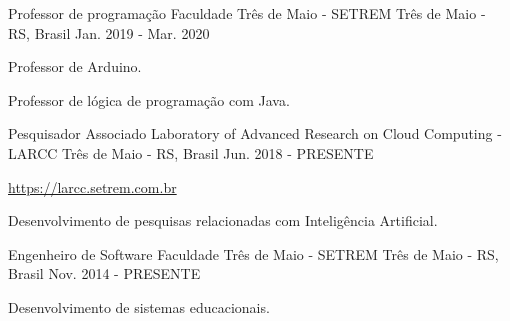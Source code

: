 
\begin{cventries}
	\cventry
	{Professor de programação} %
	{Faculdade Três de Maio - SETREM} %
	{Três de Maio - RS, Brasil} %
	{Jan. 2019 - Mar. 2020} %
	{
		\begin{cvitems} %
			\item {Professor de Arduino.}
			\item {Professor de lógica de programação com Java.}
		\end{cvitems}
	}

	\cventry
	{Pesquisador Associado} %
	{Laboratory of Advanced Research on Cloud Computing - LARCC} %
	{Três de Maio - RS, Brasil} %
	{Jun. 2018 - PRESENTE} %
	{
		\begin{cvitems} %
			\item {\href{https://larcc.setrem.com.br}{https://larcc.setrem.com.br}}
			\item {Desenvolvimento de pesquisas relacionadas com Inteligência Artificial.}
		\end{cvitems}
	}

	\cventry
	{Engenheiro de Software} %
	{Faculdade Três de Maio - SETREM} %
	{Três de Maio - RS, Brasil} %
	{Nov. 2014 - PRESENTE} %
	{
		\begin{cvitems} %
			\item {Desenvolvimento de sistemas educacionais.}
		\end{cvitems}
	}

\end{cventries}
